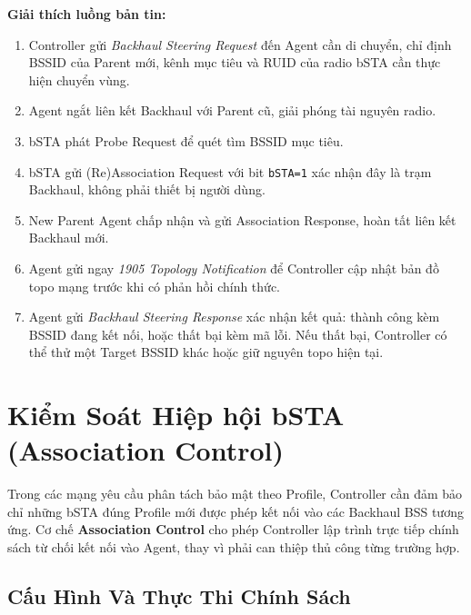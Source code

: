 \textbf{Giải thích luồng bản tin:}
\begin{enumerate}
	\item Controller gửi \textit{Backhaul Steering Request} đến Agent cần di chuyển,
	chỉ định BSSID của Parent mới, kênh mục tiêu và RUID của radio bSTA cần
	thực hiện chuyển vùng.
	\item Agent ngắt liên kết Backhaul với Parent cũ, giải phóng tài nguyên radio.
	\item bSTA phát Probe Request để quét tìm BSSID mục tiêu.
	\item bSTA gửi (Re)Association Request với bit \texttt{bSTA=1} xác nhận đây là
	trạm Backhaul, không phải thiết bị người dùng.
	\item New Parent Agent chấp nhận và gửi Association Response, hoàn tất liên kết
	Backhaul mới.
	\item Agent gửi ngay \textit{1905 Topology Notification} để Controller cập nhật
	bản đồ topo mạng trước khi có phản hồi chính thức.
	\item Agent gửi \textit{Backhaul Steering Response} xác nhận kết quả: thành công
	kèm BSSID đang kết nối, hoặc thất bại kèm mã lỗi. Nếu thất bại, Controller
	có thể thử một Target BSSID khác hoặc giữ nguyên topo hiện tại.
\end{enumerate}


\section{Kiểm Soát Hiệp hội bSTA (Association Control)}

Trong các mạng yêu cầu phân tách bảo mật theo Profile, Controller cần đảm bảo chỉ
những bSTA đúng Profile mới được phép kết nối vào các Backhaul BSS tương ứng. Cơ chế
\textbf{Association Control} cho phép Controller lập trình trực tiếp chính sách từ chối
kết nối vào Agent, thay vì phải can thiệp thủ công từng trường hợp.


\subsection{Cấu Hình Và Thực Thi Chính Sách}

